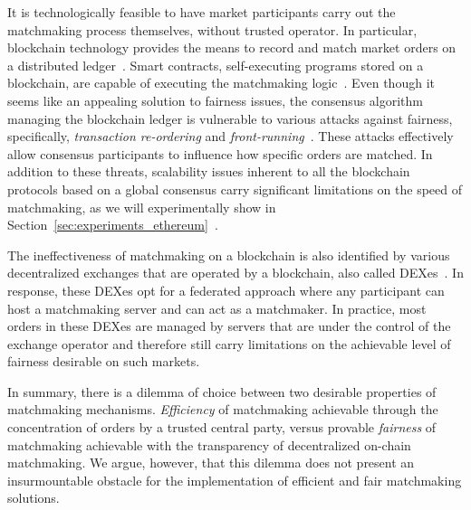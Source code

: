It is technologically feasible to have market participants carry out the matchmaking process themselves, without trusted operator.
In particular, blockchain technology provides the means to record and match market orders on a distributed ledger~\cite{subramanian2017decentralized}.
Smart contracts, self-executing programs stored on a blockchain, are capable of executing the matchmaking logic~\cite{luu2016making}.
Even though it seems like an appealing solution to fairness issues, the consensus algorithm managing the blockchain ledger is vulnerable to various attacks against fairness, specifically, \emph{transaction re-ordering} and \emph{front-running}~\cite{eskandari2019sok,kolluri2019exploiting,judmayer2019}.
These attacks effectively allow consensus participants to influence how specific orders are matched.
In addition to these threats, scalability issues inherent to all the blockchain protocols based on a global consensus carry significant limitations on the speed of matchmaking, as we will experimentally show in Section~\ref{sec:experiments_ethereum}~\cite{daian2019}.


The ineffectiveness of matchmaking on a blockchain is also identified by various decentralized exchanges that are operated by a blockchain, also called DEXes~\cite{eskandari2019sok,warren20170x,idex}.
In response, these DEXes opt for a federated approach where any participant can host a matchmaking server and can act as a matchmaker.
In practice, most orders in these DEXes are managed by servers that are under the control of the exchange operator and therefore still carry limitations on the achievable level of fairness desirable on such markets.

In summary, there is a dilemma of choice between two desirable properties of matchmaking mechanisms.
\emph{Efficiency} of matchmaking achievable through the concentration of orders by a trusted central party, versus provable \emph{fairness} of matchmaking achievable with the transparency of decentralized on-chain matchmaking.
We argue, however, that this dilemma does not present an insurmountable obstacle for the implementation of efficient and fair matchmaking solutions.

